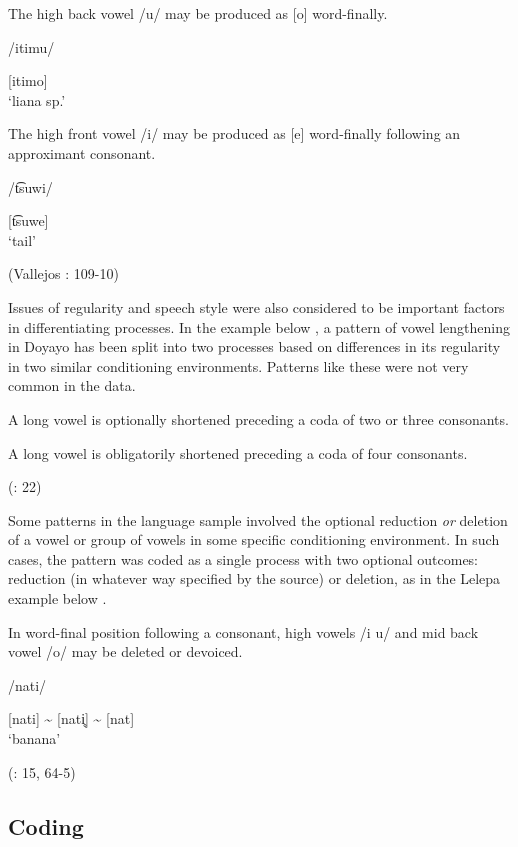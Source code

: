 \ea\label{ex:6.11}

\ea  The high back vowel /u/ may be produced as [o] word-finally.

/itimu/

[itimo]\\
\glt ‘liana sp.’

\ex   The high front vowel /i/ may be produced as [e] word-finally following an approximant consonant.

/t͡suwi/

[t͡suwe]\\
\glt ‘tail’

(Vallejos \citealt{Yopán2010}: 109-10)
\z
\z

  Issues of regularity and speech style were also considered to be important factors in differentiating processes. In the example below , a pattern of vowel lengthening in Doyayo has been split into two processes based on differences in its regularity in two similar conditioning environments. Patterns like these were not very common in the data.

\ea\label{ex:6.12}

\ea A long vowel is optionally shortened preceding a coda of two or three consonants.

\ex  A long vowel is obligatorily shortened preceding a coda of four consonants.

(\citealt{WieringWiering1994}: 22)
\z
\z

  Some patterns in the language sample involved the optional reduction \textit{or} deletion of a vowel or group of vowels in some specific conditioning environment. In such cases, the pattern was coded as a single process with two optional outcomes: reduction (in whatever way specified by the source) or deletion, as in the Lelepa example below .

\ea\label{ex:6.13}

In word-final position following a consonant, high vowels /i u/ and mid back vowel /o/ may be deleted or devoiced.

/nati/

[nati] {\textasciitilde} [nati̥] {\textasciitilde} [nat]\\
\glt ‘banana’

(\citealt{Lacrampe2014}: 15, 64-5)
\z

\subsection{Coding}\label{sec:6.2.3}

